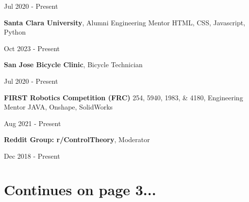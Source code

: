 \vspace{-4.5ex}
\begin{subtitle}
    Jul 2020 - Present
\end{subtitle}
\vspace{-1.5ex}

{\hspace{-1.73in}\small
\textbf{Santa Clara University}, Alumni Engineering Mentor } {\color{cyan}\small HTML, CSS, Javascript, Python}

\vspace{-4.5ex}
\begin{subtitle}
    Oct 2023 - Present
\end{subtitle}
\vspace{-1.5ex}

{\hspace{-1.73in}\small
\textbf{San Jose Bicycle Clinic}, Bicycle Technician }

\vspace{-4.5ex}
\begin{subtitle}
    Jul 2020 - Present
\end{subtitle}
\vspace{-1.5ex}

{\hspace{-1.73in}\small
\textbf{FIRST Robotics Competition (FRC)} 254, 5940, 1983, \& 4180, Engineering Mentor } {\color{cyan}\small JAVA, Onshape, SolidWorks}

\vspace{-4.5ex}
\begin{subtitle}
    Aug 2021 - Present
\end{subtitle}
\vspace{-1.5ex}

{\hspace{-1.73in}\small
\textbf{Reddit Group: r/ControlTheory}, Moderator}

\vspace{-4.5ex}
\begin{subtitle}
    Dec 2018 - Present
\end{subtitle}
\vspace{1ex}


\vspace{6ex}
\section{Continues on page 3...}{}


